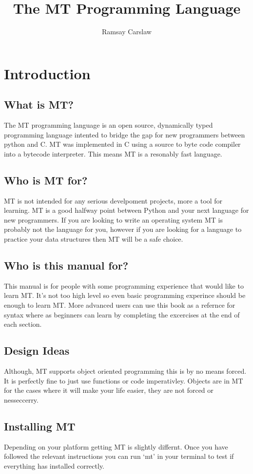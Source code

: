 \documentclass{report}
\title{The MT Programming Language}
\author{Ramsay Carslaw}
\begin{document}
\maketitle
\tableofcontents

\chapter{Introduction}
\section{What is MT?}
The MT programming language is an open source, dynamically typed programming language intented to bridge the gap for new programmers between python and C. MT was implemented in C using a source to byte code compiler into a bytecode interpreter. This means MT is a resonably fast language.

\section{Who is MT for?}
MT is not intended for any serious develpoment projects, more a tool for learning. MT is a good halfway point between Python and your next language for new programmers. If you are looking to write an operating system MT is probably not the language for you, however if you are looking for a language to practice your data structures then MT will be a safe choice.

\section{Who is this manual for?}
This manual is for people with some programming experience that would like to learn MT. It's not too high level so even basic programming experince should be enough to learn MT. More advanced users can use this book as a refernce for syntax where as beginners can learn by completing the excercises at the end of each section.

\section{Design Ideas}
Although, MT supports object oriented programming this is by no means forced. It is perfectly fine to just use functions or code imperativley. Objects are in MT for the cases where it will make your life easier, they are not forced or nesseccerry.

\section{Installing MT}
Depending on your platform getting MT is slightly differnt. Once you have followed the relevant instructions you can run `mt' in your terminal to test if everything has installed correctly.
\end{document}
